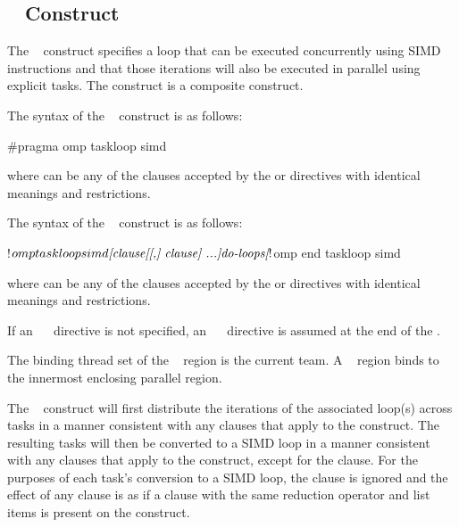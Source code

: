%
%
\subsection{~ Construct}
\label{subsec:taskloop simd Construct}
\summary
The ~ construct specifies a loop that can be
executed concurrently using SIMD instructions and that those iterations
will also be executed in parallel using explicit tasks. The 
 construct is a composite construct.

\syntax
\begin{ccppspecific}
The syntax of the ~ construct is as follows:
\begin{ompcPragma}
#pragma omp taskloop simd 
\end{ompcPragma}
where  can be any of the clauses accepted by the  or  directives with identical meanings and restrictions.
\end{ccppspecific}
\begin{fortranspecific}
The syntax of the ~ construct is as follows:
\begin{ompfPragma}
!$omp taskloop simd \plc{[clause[[,] clause] ...]}
    \plc{do-loops}
\plc{[}!$omp end taskloop simd\plc{]}
\end{ompfPragma}
where  can be any of the clauses accepted by the  or  directives with identical meanings and restrictions.

If an ~~ directive is not specified, an ~~ directive is assumed at the end of the .
\end{fortranspecific}

\binding
The binding thread set of the ~ region is the current team. A ~ region binds to the innermost enclosing parallel region.

\descr
The ~ construct will first distribute the iterations of the associated loop(s) across tasks in a manner consistent with any clauses that apply to the  construct. The resulting tasks will then be converted to a SIMD loop in a manner consistent with any clauses that apply to the  construct, except for the  clause. For the purposes of each task's conversion to a SIMD loop, the  clause is ignored and the effect of any  clause is as if a  clause with the same reduction operator and list items is present on the construct.

